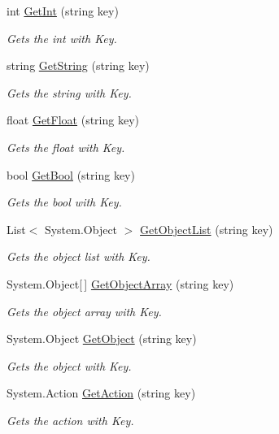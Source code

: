 \begin{DoxyCompactItemize}
\item 
int \hyperlink{class_scaffolding_1_1_s_object_adbad6746e1fbc0339f6ec2fb650ab6a1}{Get\+Int} (string key)
\begin{DoxyCompactList}\small\item\em Gets the int with Key. \end{DoxyCompactList}\item 
string \hyperlink{class_scaffolding_1_1_s_object_a6c52bfa3a63b544e2b894655f4214455}{Get\+String} (string key)
\begin{DoxyCompactList}\small\item\em Gets the string with Key. \end{DoxyCompactList}\item 
float \hyperlink{class_scaffolding_1_1_s_object_ab72b3f6b94c3a06522d8b2f9c2def605}{Get\+Float} (string key)
\begin{DoxyCompactList}\small\item\em Gets the float with Key. \end{DoxyCompactList}\item 
bool \hyperlink{class_scaffolding_1_1_s_object_a94ad6ed5838a7175ed8b56308366885e}{Get\+Bool} (string key)
\begin{DoxyCompactList}\small\item\em Gets the bool with Key. \end{DoxyCompactList}\item 
List$<$ System.\+Object $>$ \hyperlink{class_scaffolding_1_1_s_object_a4bcc3932ccdbca7def14a51da52cd98c}{Get\+Object\+List} (string key)
\begin{DoxyCompactList}\small\item\em Gets the object list with Key. \end{DoxyCompactList}\item 
System.\+Object\mbox{[}$\,$\mbox{]} \hyperlink{class_scaffolding_1_1_s_object_ac1c6ee446da4c0a8b3f99df78860c36b}{Get\+Object\+Array} (string key)
\begin{DoxyCompactList}\small\item\em Gets the object array with Key. \end{DoxyCompactList}\item 
System.\+Object \hyperlink{class_scaffolding_1_1_s_object_abdbe5a43da1a3eef59d3621584da8804}{Get\+Object} (string key)
\begin{DoxyCompactList}\small\item\em Gets the object with Key. \end{DoxyCompactList}\item 
System.\+Action \hyperlink{class_scaffolding_1_1_s_object_a392574556cb6c4ced6b93e97a74b88a0}{Get\+Action} (string key)
\begin{DoxyCompactList}\small\item\em Gets the action with Key. \end{DoxyCompactList}\end{DoxyCompactItemize}


